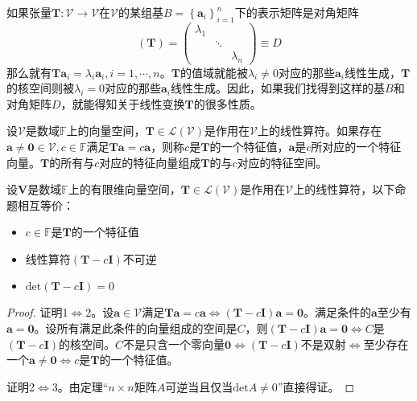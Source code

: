 \documentclass[main.tex]{subfiles}
\begin{document}
如果张量$\mathbf{T}:\mathcal{V}\rightarrow\mathcal{V}$在$\mathcal{V}$的某组基$B=\left\{\mathbf{a}_i\right\}_{i=1}^n$下的表示矩阵是对角矩阵
\[
\left(\mathbf{T}\right)=\left(\begin{array}{ccc}
\lambda_1&&\\
&\ddots&\\
&&\lambda_n
\end{array}
\right)\equiv D
\]
那么就有$\mathbf{Ta}_i=\lambda_i\mathbf{a}_i,i=1,\cdots,n$。$\mathbf{T}$的值域就能被$\lambda_i\neq 0$对应的那些$\mathbf{a}_i$线性生成，$\mathbf{T}$的核空间则被$\lambda_i=0$对应的那些$\mathbf{a}_i$线性生成。因此，如果我们找得到这样的基$B$和对角矩阵$D$，就能得知关于线性变换$\mathbf{T}$的很多性质。

\begin{definition}
设$\mathcal{V}$是数域$\mathbb{F}$上的向量空间，$\mathbf{T}\in\mathcal{L}\left(\mathcal{V}\right)$是作用在$\mathcal{V}$上的线性算符。如果存在$\mathbf{a}\neq\mathbf{0}\in\mathcal{V},c\in\mathbb{F}$满足$\mathbf{Ta}=c\mathbf{a}$，则称$c$是$\mathbf{T}$的一个特征值，$\mathbf{a}$是$c$所对应的一个特征向量。$\mathbf{T}$的所有与$c$对应的特征向量组成$\mathbf{T}$的与$c$对应的特征空间。
\end{definition}

\begin{theorem}
设$\mathbf{V}$是数域$\mathbb{F}$上的有限维向量空间，$\mathbf{T}\in\mathcal{L}\left(\mathcal{V}\right)$是作用在$\mathcal{V}$上的线性算符，以下命题相互等价：
\begin{itemize}
    \item $c\in\mathbb{F}$是$\mathbf{T}$的一个特征值
    \item 线性算符$\left(\mathbf{T}-c\mathbf{I}\right)$不可逆
    \item $\mathrm{det}\left(\mathbf{T}-c\mathbf{I}\right)=0$
\end{itemize}
\end{theorem}
\begin{proof}
证明1$\Leftrightarrow$2。设$\mathbf{a}\in\mathcal{V}$满足$\mathbf{Ta}=c\mathbf{a}\Leftrightarrow\left(\mathbf{T}-c\mathbf{I}\right)\mathbf{a}=\mathbf{0}$。满足条件的$\mathbf{a}$至少有$\mathbf{a}=\mathbf{0}$。设所有满足此条件的向量组成的空间是$C$，则$\left(\mathbf{T}-c\mathbf{I}\right)\mathbf{a}=\mathbf{0}\Leftrightarrow C$是$\left(\mathbf{T}-c\mathbf{I}\right)$的核空间。$C$不是只含一个零向量$\mathbf{0}\Leftrightarrow \left(\mathbf{T}-c\mathbf{I}\right)$不是双射$\Leftrightarrow$至少存在一个$\mathbf{a}\neq \mathbf{0}\Leftrightarrow c$是$\mathbf{T}$的一个特征值。

证明2$\Leftrightarrow$3。由定理\cite[p.~51]{周胜林2012线性代数}“$n\times n$矩阵$A$可逆当且仅当$\mathrm{det}A\neq 0$”直接得证。
\end{proof}
\end{document}
